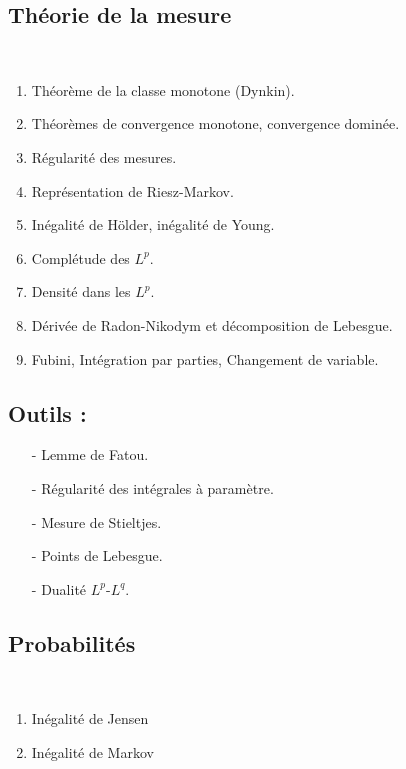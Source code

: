 \documentclass[12pt,a4paper]{article}
\begin{document}
\begin{center}
\section*{Théorie de la mesure} 
\end{center}
~\\
\begin{enumerate}
\item Théorème de la classe monotone (Dynkin).
\item Théorèmes de convergence monotone, convergence dominée.
\item Régularité des mesures.
\item Représentation de Riesz-Markov.
\item Inégalité de Hölder, inégalité de Young.
\item Complétude des $L^p$.
\item Densité dans les $L^p$.
\item Dérivée de Radon-Nikodym et décomposition de Lebesgue.
\item Fubini, Intégration par parties, Changement de variable.
\end{enumerate}


\subsection*{Outils :}
\begin{itemize}
\item[-] Lemme de Fatou.
\item[-] Régularité des intégrales à paramètre.
\item[-] Mesure de Stieltjes.
\item[-] Points de Lebesgue.
\item[-] Dualité $L^p$-$L^q$.
\end{itemize}



\newpage\begin{center}
\section*{Probabilités} 
\end{center}
~\\
\begin{enumerate}
\item Inégalité de Jensen
\item Inégalité de Markov
\end{enumerate}
\end{document}
